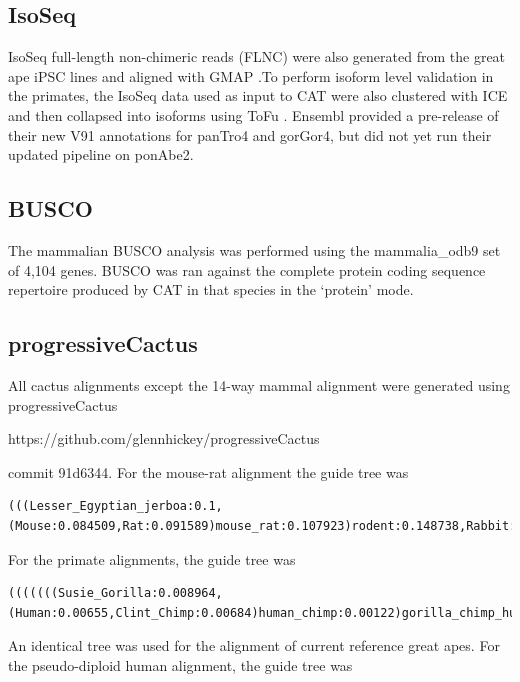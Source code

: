 \documentclass[fleqn,10pt]{wlscirep}
\begin{document}
\subsection*{IsoSeq}
IsoSeq full-length non-chimeric reads (FLNC) were also generated from the great ape iPSC lines and aligned with GMAP \cite{wu2005gmap}.To perform isoform level validation in the primates, the IsoSeq data used as input to CAT were also clustered with ICE and then collapsed into isoforms using ToFu \cite{gordon2015widespread}. Ensembl provided a pre-release of their new V91 annotations for panTro4 and gorGor4, but did not yet run their updated pipeline on ponAbe2.

\subsection*{BUSCO}
The mammalian BUSCO analysis was performed using the mammalia\_odb9 set of 4,104 genes. BUSCO was ran against the complete protein coding sequence repertoire produced by CAT in that species in the `protein' mode.

\subsection*{progressiveCactus}
	All cactus alignments except the 14-way mammal alignment were generated using progressiveCactus 
    
https://github.com/glennhickey/progressiveCactus

commit 91d6344. For the mouse-rat alignment the guide tree was 

\begin{lstlisting}[breaklines=true]
(((Lesser_Egyptian_jerboa:0.1,(Mouse:0.084509,Rat:0.091589)mouse_rat:0.107923)rodent:0.148738,Rabbit:0.21569)glires:0.015313,Human:0.143908)root;
\end{lstlisting}
    
For the primate alignments, the guide tree was 
    
\begin{lstlisting}[breaklines=true]
(((((((Susie_Gorilla:0.008964,(Human:0.00655,Clint_Chimp:0.00684)human_chimp:0.00122)gorilla_chimp_human:0.009693,Susie_Orangutan:0.01894)great_ape:0.003471,Gibbon:0.02227)great_ape_gibbon:0.01204,Rhesus:0.004991)old_world_monkey:0.02183,Squirrel_monkey:0.01035)monkey:0.05209,Bushbaby:0.1194)primate_anc:0.013494,Mouse:0.084509)root;
\end{lstlisting}
    
An identical tree was used for the alignment of current reference great apes. For the pseudo-diploid human alignment, the guide tree was 
    
\end{document}
